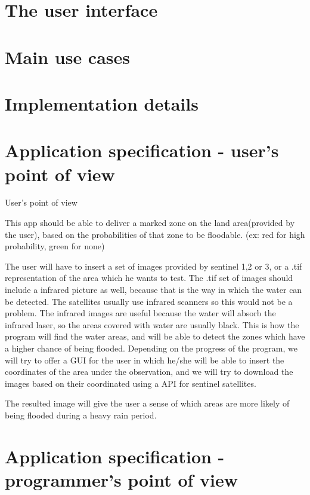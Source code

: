 \documentclass[12pt, a4paper]{report}
\begin{document}
\section{The user interface}


\section{Main use cases}


\section{Implementation details}

\newpage

\section{Application specification - user's point of view}

{\Large User's point of view\par}

This app should be able to deliver a marked zone on the land area(provided by the user), based on the probabilities of that zone to be floodable. (ex: red for high probability, green for none)\par 

The user will have to insert a set of images provided by sentinel 1,2 or 3, or a .tif representation of the area which he wants to test. The .tif set of images should include a infrared picture as well, because that is the way in which the water can be detected. The satellites usually use infrared scanners so this would not be a problem. The infrared images are useful because the water will absorb the infrared laser, so the areas covered with water are usually black. This is how the program will find the water areas, and will be able to detect the zones which have a higher chance of being flooded. Depending on the progress of the program, we will try to offer a GUI for the user in which he/she will be able to insert the coordinates of the area under the observation, and we will try to download the images based on their coordinated using a API for sentinel satellites.

\par 
The resulted image will give the user a sense of which areas are more likely of being flooded during a heavy rain period.

\newpage

\section{Application specification - programmer's point of view}
\end{document}
